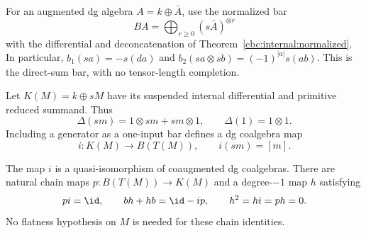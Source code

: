 For an augmented dg algebra $A=k\oplus\bar A$, use the normalized bar
\[
 BA=\bigoplus_{r\ge0}(s\bar A)^{\otimes r}
\]
with the differential and deconcatenation of Theorem~\ref{cbc:internal:normalized}.
In particular, $b_1(sa)=-s(da)$ and $b_2(sa\otimes sb)=(-1)^{|a|}s(ab)$.
This is the direct-sum bar, with no tensor-length completion.

Let $K(M)=k\oplus sM$ have its suspended internal differential and primitive reduced summand.
Thus
\[
 \Delta(sm)=1\otimes sm+sm\otimes1,
 \qquad \Delta(1)=1\otimes1.
\]
Including a generator as a one-input bar defines a dg coalgebra map
\begin{equation}\label{eq:cbc:free:inclusion}
 i:K(M)\longrightarrow B(T(M)),\qquad i(sm)=[m].
\end{equation}

\begin{theorem}\label{cbc:free:bar}
The map $i$ is a quasi-isomorphism of coaugmented dg coalgebras.
There are natural chain maps $p:B(T(M))\to K(M)$ and a degree-$-1$ map $h$ satisfying
\[
 pi=\id,\qquad bh+hb=\id-ip,\qquad h^2=hi=ph=0.
\]
No flatness hypothesis on $M$ is needed for these chain identities.
\end{theorem}
